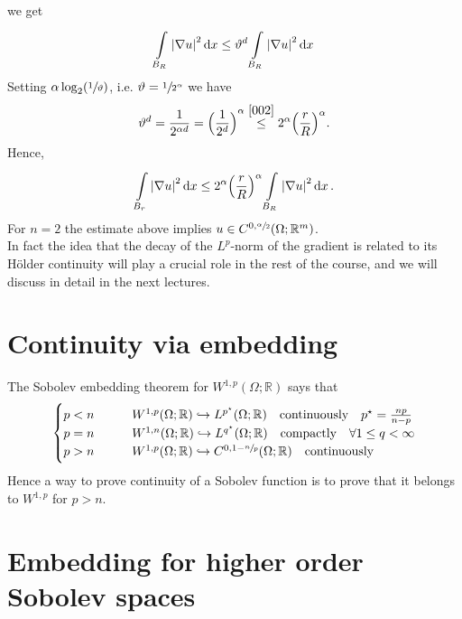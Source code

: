 we get
\begin{gather}
    \int\limits_{B_{R}}^{} \abs{\nabla u}^{2} \dd{x} \leq \vartheta^{d}\int\limits_{B_{R}}^{} \abs{\nabla u}^{2} \dd{x}
\end{gather}
Setting \(\alpha \log_{2}(\sfrac{1}{\vartheta})\), i.e. \(\vartheta = \sfrac{1}{2^{\alpha}}\) we have
\begin{gather}
    \vartheta^{d}= \frac{1}{2^{\alpha d}} = {\Big( \frac{1}{2^{d}} \Big)}^{\alpha} \overset{\eqref{002}}{\leq} 2^{\alpha}{\Big( \frac{r}{R} \Big)}^{\alpha}.
\end{gather}
Hence, 
\begin{gather}
    \int\limits_{B_{r}}^{} \abs{\nabla u}^{2} \dd{x} \leq 2^{\alpha} {\Big( \frac{r}{R} \Big)}^{\alpha} \int\limits_{B_{R}}^{} \abs{\nabla u}^{2} \dd{x}.
\end{gather}
For \(n=2\) the estimate above implies \(u \in C^{0, \sfrac{\alpha}{2}}(\Omega; \mathbb{R}^{m})\).\\
In fact the idea that the decay of the \(L^{p}\)-norm of the gradient is related to its Hölder continuity will play a crucial role in the rest of the course, and we will discuss in detail in the next lectures.

\section{Continuity via embedding}

The Sobolev embedding theorem for \(W^{1,p}(\Omega; \mathbb{R})\) says that
\begin{align}
    \begin{cases}
         p<n \qquad &W^{1,p}(\Omega; \mathbb{R}) \hookrightarrow L^{p^{\star}}(\Omega;\mathbb{R}) \quad \text{continuously} \quad p^{\star}=\frac{np}{n-p}\\
        p=n \qquad  &W^{1,n}(\Omega; \mathbb{R}) \hookrightarrow L^{q^{\star}}(\Omega;\mathbb{R}) \quad \text{compactly} \quad \forall 1 \leq q < \infty \\
        p > n \qquad &W^{1,p}(\Omega; \mathbb{R}) \hookrightarrow C^{0, 1-\sfrac{n}{p}}(\Omega;\mathbb{R}) \quad \text{continuously}
    \end{cases}
\end{align}
Hence a way to prove continuity of a Sobolev function is to prove that it belongs to \(W^{1,p}\) for \(p>n\).

\section{Embedding for higher order Sobolev spaces}

